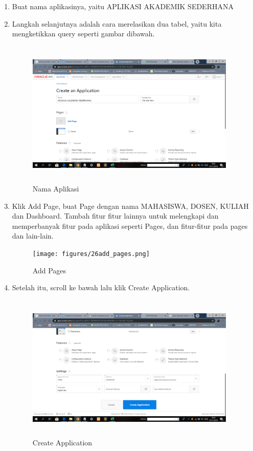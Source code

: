 \begin{enumerate}
\item Buat nama aplikasinya, yaitu APLIKASI AKADEMIK SEDERHANA
\item Langkah selanjutnya adalah cara merelasikan dua tabel, yaitu kita mengketikkan query seperti gambar dibawah.
\begin{figure}[!htbp]
\centering
\includegraphics[width=10cm,height=7cm]{figures/25nama_aplikasi.png}
\caption{Nama Aplikasi}
\label{penanda}
\end{figure}

\item Klik Add Page, buat Page dengan nama MAHASISWA, DOSEN, KULIAH dan Dashboard. Tambah fitur fitur lainnya untuk melengkapi dan memperbanyak fitur pada aplikasi seperti Pages, dan fitur-fitur pada pages dan lain-lain.

\begin{figure}[!htbp]
\centering
\texttt{[image: figures/26add\_pages.png]}
\caption{Add Pages}
\label{penanda}
\end{figure}

\item Setelah itu, scroll ke bawah lalu klik Create Application.

\begin{figure}[!htbp]
\centering
\includegraphics[width=10cm,height=7cm]{figures/30create_app.png}
\caption{Create Application}
\label{penanda}
\end{figure}


\end{enumerate}
